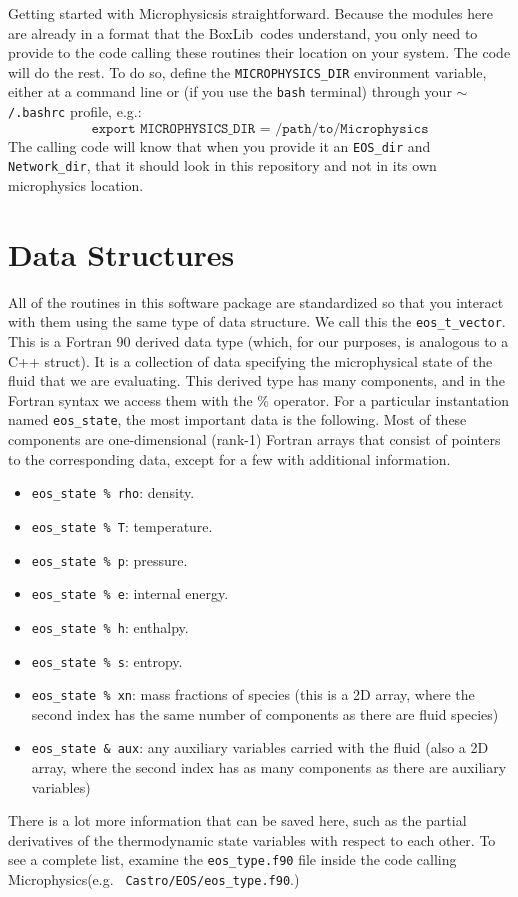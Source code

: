\documentclass[11pt]{book}
\newcommand{\boxlib}{{\sf BoxLib}}
\newcommand{\microphysics}{{\sf Microphysics}}
\begin{document}
Getting started with \microphysics is straightforward. Because the
modules here are already in a format that the \boxlib\ codes
understand, you only need to provide to the code calling these
routines their location on your system. The code will do the rest. To
do so, define the {\tt MICROPHYSICS\_DIR} environment variable, either
at a command line or (if you use the {\tt bash} terminal) through your
{\tt $\sim$/.bashrc} profile, e.g.:
\begin{equation*}
  \texttt{export MICROPHYSICS\_DIR = /path/to/Microphysics}
\end{equation*}
The calling code will know that when you provide it an {\tt EOS\_dir}
and {\tt Network\_dir}, that it should look in this repository and not
in its own microphysics location.

\chapter{Data Structures}
\label{sec:data_structures}

All of the routines in this software package are standardized so that
you interact with them using the same type of data structure. We call
this the {\tt eos\_t\_vector}. This is a Fortran 90 derived data type
(which, for our purposes, is analogous to a C++ struct). It is a
collection of data specifying the microphysical state of the fluid
that we are evaluating.  This derived type has many components, and in
the Fortran syntax we access them with the \% operator. For a
particular instantation named {\tt eos\_state}, the most important
data is the following. Most of these components are one-dimensional
(rank-1) Fortran arrays that consist of pointers to the corresponding
data, except for a few with additional information.
\begin{itemize}
  \item {\tt eos\_state \% rho}: density.
  \item {\tt eos\_state \% T}: temperature.
  \item {\tt eos\_state \% p}: pressure.
  \item {\tt eos\_state \% e}: internal energy.
  \item {\tt eos\_state \% h}: enthalpy.
  \item {\tt eos\_state \% s}: entropy.
  \item {\tt eos\_state \% xn}: mass fractions of species (this is a
    2D array, where the second index has the same number of components
    as there are fluid species)
  \item {\tt eos\_state \& aux}: any auxiliary variables carried with
    the fluid (also a 2D array, where the second index has as many
    components as there are auxiliary variables)
\end{itemize}
There is a lot more information that can be saved here, such as the
partial derivatives of the thermodynamic state variables with respect
to each other. To see a complete list, examine the {\tt eos\_type.f90}
file inside the code calling \microphysics (e.g. {\tt
  Castro/EOS/eos\_type.f90}.)
\end{document}
